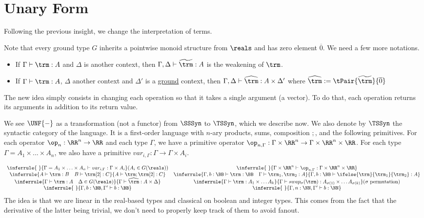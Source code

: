 \section{Unary Form}

Following the previous insight, we change the interpretation of terms. 

Note that every ground type $G$ inherits a pointwise monoid structure from $\reals$ and has zero element $\overline{0}$.
We need a few  more notations.

\begin{notation}
	\begin{itemize}
		\item If $\Gamma\vdash \trm:A$ and $\Delta$ is another context, then $\Gamma,\Delta\vdash \widetilde{\trm}:A$ is the weakening of $\trm$.
		\item If $\Gamma\vdash \trm:A$, $\Delta$ another context and $\Delta'$ is a \underline{ground} context, then  $\Gamma,\Delta\vdash \widehat{\trm}:A\times \Delta'$ where $\widehat{\trm}:= \tPair{\widetilde{\trm}}{\overline{0}}$
	\end{itemize}
\end{notation}

The new idea simply consists in changing each operation so that it takes a single argument (a vector). To do that, each operation returns its arguments in addition to its return value. 

We see $\UNF{-}$ as a transformation (not a functor) from $\SSSyn$ to $\TSSyn$, which we describe now. We also denote by $\TSSyn$ the syntactic category of the language. It is a first-order language with $n$-ary products, sums, composition $;$, and the following primitives. For each operator $\op_n:\RR^n\to \RR$ and each type $\Gamma$, we have a primitive operator $\op_{n,\Gamma}:\Gamma\times \RR^n\to \Gamma\times \RR^n\times \RR$. For each type $\Gamma=A_1\times...\times A_n$, we also have a primitive $var_{i,\Gamma}:\Gamma\to \Gamma\times A_i$. 

\[
\begin{array}{cc}
	\inferrule{~}{\Gamma=A_1\times\ldots \times A_n\vdash var_{i,\Gamma}: \Gamma\times A_i }(A_i\in G(\reals))
	& \inferrule{~}{\Gamma\times \RR^n \vdash \op_{n,\Gamma}: \Gamma\times \RR^n\times \RR }\\
	\inferrule{A \vdash \trm: B \quad B \vdash \trm[2]: C}{A\vdash \trm;\trm[2]:C} 
	& \inferrule{\Gamma,b:\BB\vdash\trm:\BB\quad \Gamma \vdash \trm_1,\trm_2:A }{\Gamma,b:\BB\vdash \ifelse{\trm}{\trm_1}{\trm_2}:A}\\
	\inferrule{\Gamma\vdash \trm:A \quad \Delta\in G(\reals)}{\Gamma\vdash \widehat{\trm}:A\times \Delta }
	& \inferrule{\Gamma\vdash \trm: A_1\times\ldots A_k}{\Gamma\vdash swap_\sigma(\trm):A_{\sigma(1)}\times\ldots A_{\sigma(k)}}(\sigma\text{ permutation})\\
	\inferrule{~}{\Gamma,b:\BB,\Gamma'\vdash b:\BB}
	&\inferrule{~}{\Gamma,n:\NN,\Gamma'\vdash b:\NN}
\end{array}
\]
The idea is that we are linear in the real-based types and classical on boolean and integer types. This comes from the fact that the derivative of the latter being trivial, we don't need to properly keep track of them to avoid fanout.

